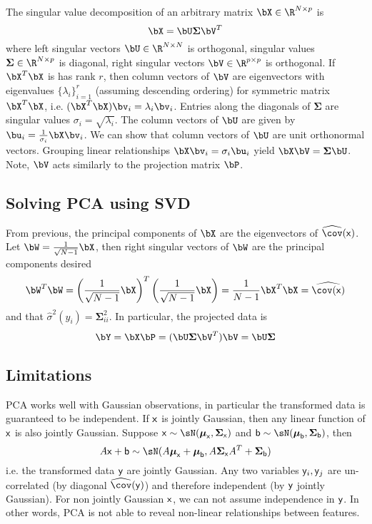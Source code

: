 \documentclass[11pt]{article}
\begin{document}
The singular value decomposition of an arbitrary matrix $\bX \in \R^{N\times p}$ is
\[
    \bX = \bU \boldsymbol{\Sigma} \bV^T
\]
where left singular vectors $\bU \in \R^{N\times N}$ is orthogonal, singular values $\boldsymbol{\Sigma} \in \R^{N\times p}$ is diagonal, right singular vectors $\bV \in \R^{p\times p}$ is orthogonal. If $\bX^T\bX$ is has rank $r$, then column vectors of $\bV$ are eigenvectors with eigenvalues $\{\lambda_i\}_{i=1}^r$ (assuming descending ordering) for symmetric matrix $\bX^T\bX$, i.e. $(\bX^T\bX) \bv_i = \lambda_i \bv_i$. Entries along the diagonals of $\boldsymbol{\Sigma}$ are singular values $\sigma_i = \sqrt{\lambda_i}$. The column vectors of $\bU$ are given by $\bu_i = \frac{1}{\sigma_i} \bX \bv_i$. We can show that column vectors of $\bU$ are unit orthonormal vectors. Grouping linear relationships $\bX \bv_i = \sigma_i \bu_i$ yield $\bX \bV = \boldsymbol{\Sigma}\bU$. Note, $\bV$ acts similarly to the projection matrix $\bP$. 

\subsection{Solving PCA using SVD}

From previous, the principal components of $\bX$ are the eigenvectors of $\widehat{\cov}(\rx)$. Let $\bW = \frac{1}{\sqrt{N-1}} \bX$, then right singular vectors of $\bW$ are the principal components desired
\[
    \bW^T\bW 
    = \left( \frac{1}{\sqrt{N-1}} \bX \right)^T \left( \frac{1}{\sqrt{N-1}} \bX \right)
    = \frac{1}{N-1} \bX^T\bX
    = \widehat{\cov(\rx)}
\]
and that $\hat{\sigma}^2(y_i) = \boldsymbol{\Sigma}_{ii}^2$. In particular, the projected data is 
\[
    \bY = \bX\bP = (\bU\bSigma\bV^T)\bV = \bU\bSigma    
\]


\subsection{Limitations}

PCA works well with Gaussian observations, in particular the transformed data is guaranteed to be independent. If $\mathsf{x}$ is jointly Gaussian, then any linear function of $\mathsf{x}$ is also jointly Gaussian. Suppose $\rx \sim \sN(\bmu_{\rx},\bSigma_{\rx})$ and $\rb \sim \sN(\boldsymbol{\mu}_{\rb},\boldsymbol{\Sigma}_{\rb})$, then
\[
    A\rx + \rb \sim \sN(A\bmu_{\rx} + \bmu_{\rb}, A\bSigma_{\rx} A^T + \bSigma_{\rb})
\]
i.e. the transformed data $\mathsf{y}$ are jointly Gaussian. Any two variables $\mathsf{y}_i,\mathsf{y}_j$ are un-correlated (by diagonal $\widehat{\cov}(\ry)$) and therefore independent (by $\mathsf{y}$ jointly Gaussian). For non jointly Gaussian $\mathsf{x}$, we can not assume independence in $\mathsf{y}$. In other words, PCA is not able to reveal non-linear relationships between features.
\end{document}

